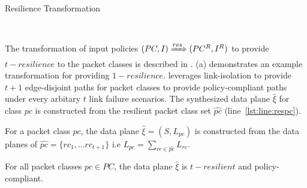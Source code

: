 \begin{algorithm}[h]
	\begin{footnotesize}
		\caption{Resilience Transformation}
		\label{restransform}
		\begin{algorithmic}[1]
			\vspace*{0.25cm}
			 \label{lst:line:respc}
			\EndFor
			 \label{lst:line:respolicy}
			\EndFor \\
		\end{algorithmic}
	\end{footnotesize}
\end{algorithm}
\noindent The transformation of input policies $(PC, I) \xRightarrow{res} (PC^R, I^R)$ to provide $t-resilience$ to the packet classes is described in . (a) demonstrates an example transformation for providing $1-resilience$. 
\name leverages link-isolation to provide $t+1$ edge-disjoint paths for packet classes to provide policy-compliant paths under every arbitary $t$ link failure scenarios. The synthesized data plane $\hat{\xi}$ for class $pc$ is constructed from the resilient packet class set $\hat{pc}$ (line~\ref{lst:line:respc}).
\begin{mydef}
For a packet class $pc$, the data plane $\hat{\xi} = (S, L_{pc}) $ is constructed from the data planes of $\hat{pc} = \{rc_1, \ldots rc_{t+1}\}$ i.e $L_{pc} = \sum\limits_{rc \in \hat{pc}} L_{rc}$. 
\end{mydef}
\begin{theorem}[Soundness]
	For all packet classes $pc \in PC$, the data plane $\hat{\xi}$ is $t-resilient$ 
	and policy-compliant. 
\end{theorem}
